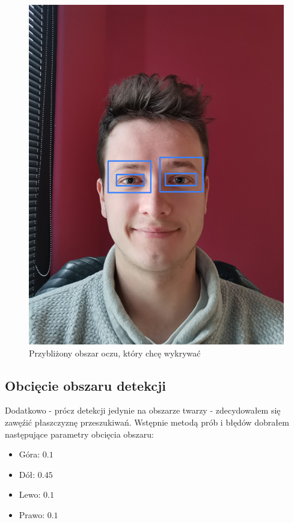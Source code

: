 \documentclass[10pt, a4paper]{article}
\begin{document}
\begin{figure}[H]
    \begin{center}
        \includegraphics[scale=0.6]{images/expected_eyes_region.png}
        \caption{Przybliżony obszar oczu, który chcę wykrywać}
        \label{fig:expected_eyes_region}
    \end{center}
\end{figure}

\subsection{Obcięcie obszaru detekcji}
Dodatkowo - prócz detekcji jedynie na obszarze twarzy - zdecydowałem się zawęźić płaszczyznę przeszukiwań.
Wstępnie metodą prób i błędów dobrałem następujące parametry obcięcia obszaru:
\begin{itemize}
    \item Góra: $0.1$
    \item Dół: $0.45$
    \item Lewo: $0.1$
    \item Prawo: $0.1$
\end{itemize}
\end{document}
